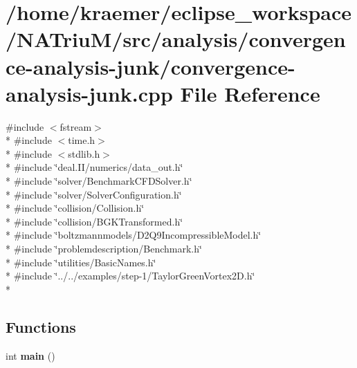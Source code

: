 \hypertarget{convergence-analysis-junk_8cpp}{\section{/home/kraemer/eclipse\-\_\-workspace/\-N\-A\-Triu\-M/src/analysis/convergence-\/analysis-\/junk/convergence-\/analysis-\/junk.cpp File Reference}
\label{convergence-analysis-junk_8cpp}
}
{\ttfamily \#include $<$fstream$>$}\\*
{\ttfamily \#include $<$time.\-h$>$}\\*
{\ttfamily \#include $<$stdlib.\-h$>$}\\*
{\ttfamily \#include \char`\"{}deal.\-I\-I/numerics/data\-\_\-out.\-h\char`\"{}}\\*
{\ttfamily \#include \char`\"{}solver/\-Benchmark\-C\-F\-D\-Solver.\-h\char`\"{}}\\*
{\ttfamily \#include \char`\"{}solver/\-Solver\-Configuration.\-h\char`\"{}}\\*
{\ttfamily \#include \char`\"{}collision/\-Collision.\-h\char`\"{}}\\*
{\ttfamily \#include \char`\"{}collision/\-B\-G\-K\-Transformed.\-h\char`\"{}}\\*
{\ttfamily \#include \char`\"{}boltzmannmodels/\-D2\-Q9\-Incompressible\-Model.\-h\char`\"{}}\\*
{\ttfamily \#include \char`\"{}problemdescription/\-Benchmark.\-h\char`\"{}}\\*
{\ttfamily \#include \char`\"{}utilities/\-Basic\-Names.\-h\char`\"{}}\\*
{\ttfamily \#include \char`\"{}../../examples/step-\/1/\-Taylor\-Green\-Vortex2\-D.\-h\char`\"{}}\\*
\subsection*{Functions}
\begin{DoxyCompactItemize}
\item 
\hypertarget{convergence-analysis-junk_8cpp_ae66f6b31b5ad750f1fe042a706a4e3d4}{int {\bfseries main} ()}\label{convergence-analysis-junk_8cpp_ae66f6b31b5ad750f1fe042a706a4e3d4}

\end{DoxyCompactItemize}


